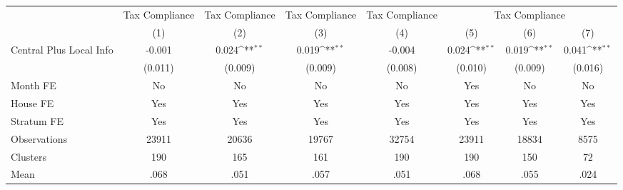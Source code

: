 {
\def\sym#1{\ifmmode^{#1}\else\(^{#1}\)\fi}
\begin{tabular}{l*{7}{c}}
\hline\hline
                &\multicolumn{1}{c}{Tax Compliance}&\multicolumn{1}{c}{Tax Compliance}&\multicolumn{1}{c}{Tax Compliance}&\multicolumn{1}{c}{Tax Compliance}&\multicolumn{3}{c}{Tax Compliance}                      \\
                &\multicolumn{1}{c}{(1)}         &\multicolumn{1}{c}{(2)}         &\multicolumn{1}{c}{(3)}         &\multicolumn{1}{c}{(4)}         &\multicolumn{1}{c}{(5)}         &\multicolumn{1}{c}{(6)}         &\multicolumn{1}{c}{(7)}         \\
\hline
Central Plus Local Info&   -0.001         &    0.024\sym{**} &    0.019\sym{**} &   -0.004         &    0.024\sym{**} &    0.019\sym{**} &    0.041\sym{**} \\
                &  (0.011)         &  (0.009)         &  (0.009)         &  (0.008)         &  (0.010)         &  (0.009)         &  (0.016)         \\
Month FE        &       No         &       No         &       No         &       No         &      Yes         &       No         &       No         \\
House FE        &      Yes         &      Yes         &      Yes         &      Yes         &      Yes         &      Yes         &      Yes         \\
Stratum FE      &      Yes         &      Yes         &      Yes         &      Yes         &      Yes         &      Yes         &      Yes         \\
\hline
Observations    &    23911         &    20636         &    19767         &    32754         &    23911         &    18834         &     8575         \\
Clusters        &      190         &      165         &      161         &      190         &      190         &      150         &       72         \\
Mean            &     .068         &     .051         &     .057         &     .051         &     .068         &     .055         &     .024         \\
\hline\hline
\end{tabular}
}
